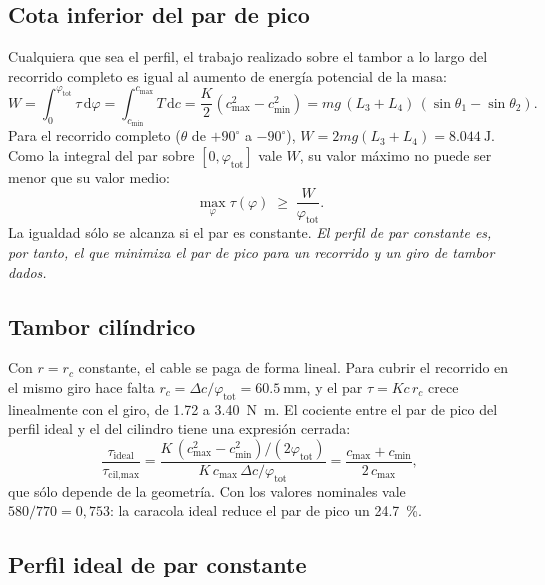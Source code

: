\subsection{Cota inferior del par de pico}

Cualquiera que sea el perfil, el trabajo realizado sobre el tambor a lo largo del recorrido
completo es igual al aumento de energía potencial de la masa:
\begin{equation}
  W = \int_0^{\varphi_{\text{tot}}} \tau\,\mathrm{d}\varphi = \int_{c_{\min}}^{c_{\max}} T\,\mathrm{d}c
    = \frac{K}{2}\left(c_{\max}^2 - c_{\min}^2\right) = mg\,(L_3+L_4)\,(\sin\theta_1-\sin\theta_2).
  \label{eq:trabajo}
\end{equation}
Para el recorrido completo ($\theta$ de $+90^\circ$ a $-90^\circ$), $W = 2mg(L_3+L_4) =
\SI{8.044}{\joule}$. Como la integral del par sobre $[0,\varphi_{\text{tot}}]$ vale $W$, su valor
máximo no puede ser menor que su valor medio:
\begin{equation}
  \max_{\varphi}\tau(\varphi) \;\geq\; \frac{W}{\varphi_{\text{tot}}}.
  \label{eq:cota}
\end{equation}
La igualdad sólo se alcanza si el par es constante. \emph{El perfil de par constante es, por
tanto, el que minimiza el par de pico para un recorrido y un giro de tambor dados.}

\subsection{Tambor cilíndrico}

Con $r=r_c$ constante, el cable se paga de forma lineal. Para cubrir el recorrido en el mismo giro
hace falta $r_c = \Delta c/\varphi_{\text{tot}} = \SI{60.5}{\milli\metre}$, y el par
$\tau = K c\, r_c$ crece linealmente con el giro, de \num{1.72} a \SI{3.40}{\newton\metre}. El
cociente entre el par de pico del perfil ideal y el del cilindro tiene una expresión cerrada:
\begin{equation}
  \frac{\tau_{\text{ideal}}}{\tau_{\text{cil,max}}}
    = \frac{K\,(c_{\max}^2 - c_{\min}^2)/(2\varphi_{\text{tot}})}{K\,c_{\max}\,\Delta c/\varphi_{\text{tot}}}
    = \frac{c_{\max}+c_{\min}}{2\,c_{\max}},
  \label{eq:reduccion}
\end{equation}
que sólo depende de la geometría. Con los valores nominales vale $580/770 = 0{,}753$: la caracola
ideal reduce el par de pico un \SI{24.7}{\percent}.

\subsection{Perfil ideal de par constante}


